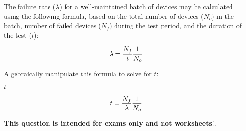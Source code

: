 

The failure rate ($\lambda$) for a well-maintained batch of devices may be calculated using the following formula, based on the total number of devices ($N_o$) in the batch, number of failed devices ($N_f$) during the test period, and the duration of the test ($t$):

$$\lambda = {N_f \over t} {1 \over N_o}$$

Algebraically manipulate this formula to solve for $t$:

\vskip 20pt

$t = $







$$t = {N_f \over \lambda} {1 \over N_o}$$







{\bf This question is intended for exams only and not worksheets!}.



